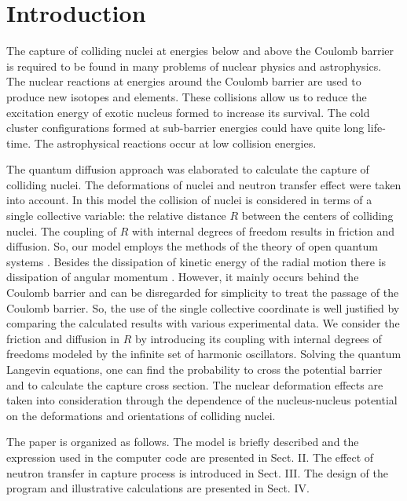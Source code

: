 \documentclass[preprint,review,12pt]{elsarticle}
\begin{document}
\newpage

\section{Introduction}
The capture of colliding nuclei at energies below and above the Coulomb barrier is required to be
found in many problems of nuclear physics and astrophysics.
The nuclear reactions at energies around the Coulomb barrier are used to produce new isotopes and elements.
These collisions allow us to reduce the excitation energy of exotic nucleus formed to increase
its survival. The cold cluster configurations formed at sub-barrier
energies could have quite long life-time. The astrophysical reactions occur at low collision energies.

The quantum diffusion approach \cite{VAZ,PRC2,NashiTrs} was elaborated to calculate the capture of colliding
nuclei. The deformations of nuclei and neutron transfer effect were taken into account.
In this model the collision of nuclei is considered in terms of a single collective variable: the relative
  distance $R$ between the centers of colliding nuclei. The coupling of $R$ with internal degrees of freedom
  results in friction and diffusion. So, our model employs the methods of the theory of open quantum systems
\cite{DMDadonov,Leggett,Katia,Kampen,Gardiner,Weiss,Grabert,Hofman,Ayik,Jolos}.
  Besides the dissipation of kinetic energy of the radial motion there is dissipation of angular momentum \cite{VVV,Schreder}. However, it mainly occurs behind the Coulomb barrier and can be disregarded for simplicity
  to treat the passage of the Coulomb barrier. So, the use of the single collective coordinate is
  well justified by comparing the calculated results with various experimental data.
We consider the friction and diffusion in $R$ by introducing its coupling with internal degrees of freedoms
modeled by the infinite set of harmonic oscillators. Solving the quantum Langevin equations, one can find
the probability to cross the potential barrier and to calculate the capture cross section.
  The nuclear deformation effects are taken into consideration through the dependence
  of the nucleus-nucleus potential on the deformations and
  orientations of colliding nuclei.

The paper is organized as follows. The model is briefly described and the expression used
in the computer code are presented in Sect. II. The effect of neutron transfer in capture process
is introduced in Sect. III. The design of the program and illustrative calculations are presented in Sect. IV.
\end{document}
